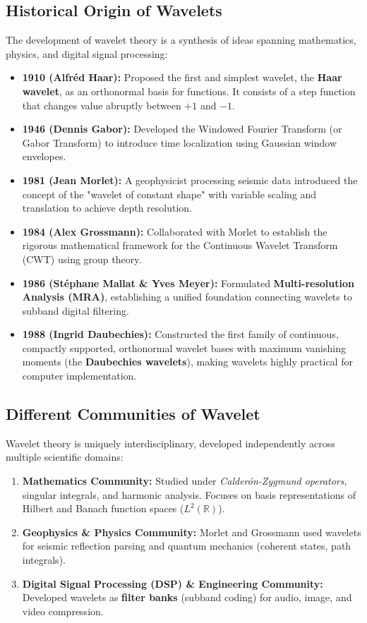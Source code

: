 \documentclass[12pt,a4paper]{article}
\begin{document}
\subsection{Historical Origin of Wavelets}
The development of wavelet theory is a synthesis of ideas spanning mathematics, physics, and digital signal processing:
\begin{itemize}[leftmargin=*, itemsep=3pt]
  \item \textbf{1910 (Alfréd Haar):} Proposed the first and simplest wavelet, the \textbf{Haar wavelet}, as an orthonormal basis for functions. It consists of a step function that changes value abruptly between $+1$ and $-1$.
  \item \textbf{1946 (Dennis Gabor):} Developed the Windowed Fourier Transform (or Gabor Transform) to introduce time localization using Gaussian window envelopes.
  \item \textbf{1981 (Jean Morlet):} A geophysicist processing seismic data introduced the concept of the "wavelet of constant shape" with variable scaling and translation to achieve depth resolution.
  \item \textbf{1984 (Alex Grossmann):} Collaborated with Morlet to establish the rigorous mathematical framework for the Continuous Wavelet Transform (CWT) using group theory.
  \item \textbf{1986 (Stéphane Mallat \& Yves Meyer):} Formulated \textbf{Multi-resolution Analysis (MRA)}, establishing a unified foundation connecting wavelets to subband digital filtering.
  \item \textbf{1988 (Ingrid Daubechies):} Constructed the first family of continuous, compactly supported, orthonormal wavelet bases with maximum vanishing moments (the \textbf{Daubechies wavelets}), making wavelets highly practical for computer implementation.
\end{itemize}

\subsection{Different Communities of Wavelet}
Wavelet theory is uniquely interdisciplinary, developed independently across multiple scientific domains:
\begin{enumerate}[leftmargin=*, itemsep=4pt]
  \item \textbf{Mathematics Community:} Studied under \textit{Calderón-Zygmund operators}, singular integrals, and harmonic analysis. Focuses on basis representations of Hilbert and Banach function spaces ($L^2(\mathbb{R})$).
  \item \textbf{Geophysics \& Physics Community:} Morlet and Grossmann used wavelets for seismic reflection parsing and quantum mechanics (coherent states, path integrals).
  \item \textbf{Digital Signal Processing (DSP) \& Engineering Community:} Developed wavelets as \textbf{filter banks} (subband coding) for audio, image, and video compression.
\end{enumerate}
\end{document}
